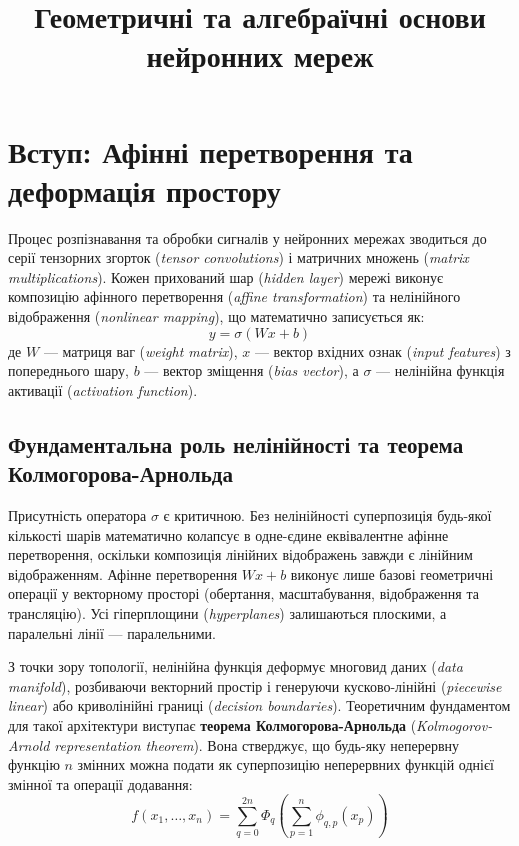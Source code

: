 \documentclass[12pt,a4paper]{article}
\begin{document}
	
	\title{Геометричні та алгебраїчні основи нейронних мереж}
	\author{}
	\date{}
	\maketitle
	
	\section{Вступ: Афінні перетворення та деформація простору}
	
	Процес розпізнавання та обробки сигналів у нейронних мережах зводиться до серії тензорних згорток (\textit{tensor convolutions}) і матричних множень (\textit{matrix multiplications}). Кожен прихований шар (\textit{hidden layer}) мережі виконує композицію афінного перетворення (\textit{affine transformation}) та нелінійного відображення (\textit{nonlinear mapping}), що математично записується як:
	$$y = \sigma(Wx + b)$$
	де $W$ — матриця ваг (\textit{weight matrix}), $x$ — вектор вхідних ознак (\textit{input features}) з попереднього шару, $b$ — вектор зміщення (\textit{bias vector}), а $\sigma$ — нелінійна функція активації (\textit{activation function}).
	
	\subsection{Фундаментальна роль нелінійності та теорема Колмогорова-Арнольда}
	Присутність оператора $\sigma$ є критичною. Без нелінійності суперпозиція будь-якої кількості шарів математично колапсує в одне-єдине еквівалентне афінне перетворення, оскільки композиція лінійних відображень завжди є лінійним відображенням. Афінне перетворення $Wx + b$ виконує лише базові геометричні операції у векторному просторі (обертання, масштабування, відображення та трансляцію). Усі гіперплощини (\textit{hyperplanes}) залишаються плоскими, а паралельні лінії — паралельними.
	
	З точки зору топології, нелінійна функція деформує многовид даних (\textit{data manifold}), розбиваючи векторний простір і генеруючи кусково-лінійні (\textit{piecewise linear}) або криволінійні границі (\textit{decision boundaries}). Теоретичним фундаментом для такої архітектури виступає \textbf{теорема Колмогорова-Арнольда} (\textit{Kolmogorov-Arnold representation theorem}). Вона стверджує, що будь-яку неперервну функцію $n$ змінних можна подати як суперпозицію неперервних функцій однієї змінної та операції додавання:
	$$f(x_1, \dots, x_n) = \sum_{q=0}^{2n} \Phi_q \left( \sum_{p=1}^n \phi_{q,p}(x_p) \right)$$
	
\end{document}
